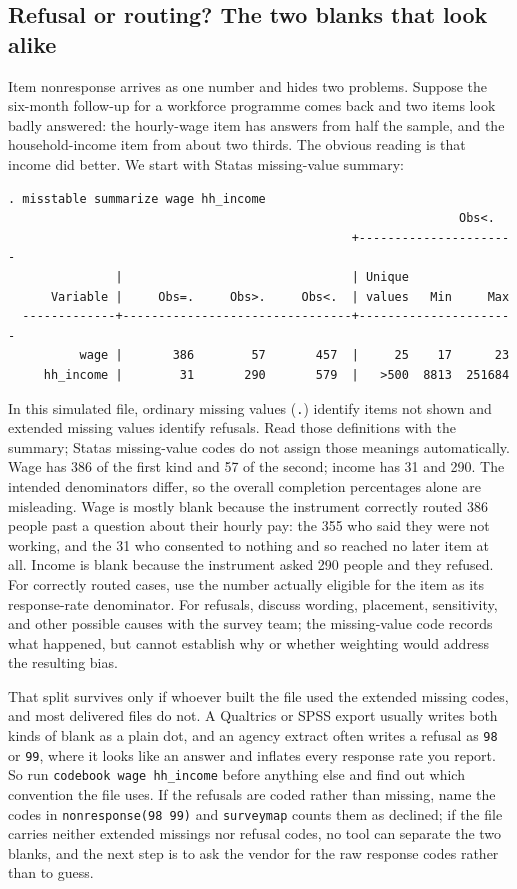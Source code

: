 \documentclass[
    a4paper,
    fontsize=10pt,
    twoside=true,
    numbers=noenddot,
]{kaobook}
\begin{document}
\subsection{Refusal or routing? The two blanks that look alike}\label{sec:ch05-surveymap}
Item nonresponse arrives as one number and hides two problems. Suppose the six-month follow-up for a workforce programme comes back and two items look badly answered: the hourly-wage item has answers from half the sample, and the household-income item from about two thirds. The obvious reading is that income did better. We start with Stata\textquotesingle s missing-value summary:
\par
{\footnotesize
\begin{verbatim}
. misstable summarize wage hh_income
                                                               Obs<.
                                                +----------------------
               |                                | Unique
      Variable |     Obs=.     Obs>.     Obs<.  | values   Min     Max
  -------------+--------------------------------+----------------------
          wage |       386        57       457  |     25    17      23
     hh_income |        31       290       579  |   >500  8813  251684
\end{verbatim}
}
In this simulated file, ordinary missing values (\texttt{.}) identify items not shown and extended missing values identify refusals. Read those definitions with the summary; Stata\textquotesingle s missing-value codes do not assign those meanings automatically. Wage has 386 of the first kind and 57 of the second; income has 31 and 290. The intended denominators differ, so the overall completion percentages alone are misleading. Wage is mostly blank because the instrument correctly routed 386 people past a question about their hourly pay: the 355 who said they were not working, and the 31 who consented to nothing and so reached no later item at all. Income is blank because the instrument asked 290 people and they refused. For correctly routed cases, use the number actually eligible for the item as its response-rate denominator. For refusals, discuss wording, placement, sensitivity, and other possible causes with the survey team; the missing-value code records what happened, but cannot establish why or whether weighting would address the resulting bias.

That split survives only if whoever built the file used the extended missing codes, and most delivered files do not. A Qualtrics or SPSS export usually writes both kinds of blank as a plain dot, and an agency extract often writes a refusal as \texttt{98} or \texttt{99}, where it looks like an answer and inflates every response rate you report. So run \texttt{codebook wage hh\_income} before anything else and find out which convention the file uses. If the refusals are coded rather than missing, name the codes in \texttt{nonresponse(98 99)} and \texttt{surveymap} counts them as declined; if the file carries neither extended missings nor refusal codes, no tool can separate the two blanks, and the next step is to ask the vendor for the raw response codes rather than to guess.
\end{document}
